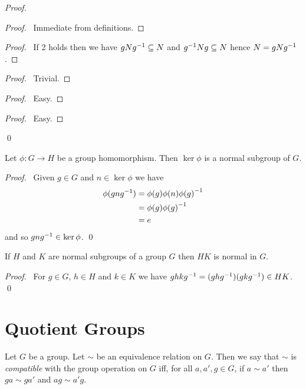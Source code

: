 \begin{proof}
\pf
{}
\begin{proof}
\pf\ Immediate from definitions.
\end{proof}
\begin{proof}
	\pf\ If 2 holds then we have $gN{g}^{-1} \subseteq N$ and ${g}^{-1}Ng \subseteq N$ hence $N = gN{g}^{-1}$.
\end{proof}
\begin{proof}
\pf\ Trivial.
\end{proof}
\begin{proof}
\pf\ Easy.
\end{proof}
\begin{proof}
\pf\ Easy.
\end{proof}
\qed
\end{proof}

\begin{prop}
\label{prop:kernel-normal}
Let $\phi : G \rightarrow H$ be a group homomorphism. Then $\ker \phi$ is a normal subgroup of $G$.
\end{prop}

\begin{proof}
\pf\ Given $g \in G$ and $n \in \ker \phi$ we have
\begin{align*}
\phi(gn{g}^{-1}) & = \phi(g) \phi(n) {\phi(g)}^{-1} \\
& = \phi(g) {\phi(g)}^{-1} \\
& = e
\end{align*}
and so $gn{g}^{-1} \in \ker \phi$. \qed
\end{proof}

\begin{prop}
\label{prop:HK-normal}
If $H$ and $K$ are normal subgroups of a group $G$ then $HK$ is normal in $G$.
\end{prop}

\begin{proof}
\pf\ For $g \in G$, $h \in H$ and $k \in K$ we have $ghk{g}^{-1} = (gh{g}^{-1})(gk{g}^{-1}) \in HK$.
\qed
\end{proof}

\section{Quotient Groups}

\begin{df}
Let $G$ be a group. Let $\sim$ be an equivalence relation on $G$. Then we say that $\sim$ is \emph{compatible} with the group operation on $G$ iff, for all $a, a', g \in G$, if $a \sim a'$ then $ga \sim ga'$ and $ag \sim a'g$.
\end{df}

